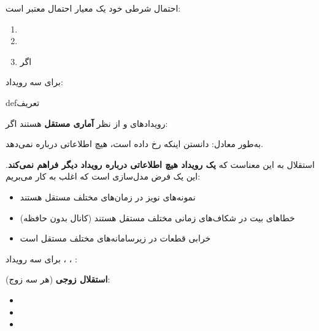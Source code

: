 
احتمال شرطی خود یک معیار احتمال معتبر است:

\begin{enumerate}
\def\labelenumi{\arabic{enumi}.}
\tightlist
\item
\item
\item
   اگر 
\end{enumerate}



برای سه رویداد:


\begin{PSbox}[unbreakable]{def}{تعریف}

رویدادهای  و  از نظر \textbf{آماری مستقل} هستند اگر:


به‌طور معادل:   دانستن اینکه  رخ داده است، هیچ اطلاعاتی درباره  نمی‌دهد.

\end{PSbox}


استقلال به این معناست که \textbf{یک رویداد هیچ اطلاعاتی درباره رویداد دیگر فراهم نمی‌کند}. این یک فرض مدل‌سازی است که اغلب به کار می‌بریم:

\begin{itemize}
\tightlist
\item
  نمونه‌های نویز در زمان‌های مختلف مستقل هستند
\item
  خطاهای بیت در شکاف‌های زمانی مختلف مستقل هستند (کانال بدون حافظه)
\item
  خرابی قطعات در زیرسامانه‌های مختلف مستقل است
\end{itemize}


برای سه رویداد ، ، :

\textbf{استقلال زوجی} (هر سه زوج):

\begin{itemize}
\tightlist
\item
\item
\item
\end{itemize}

